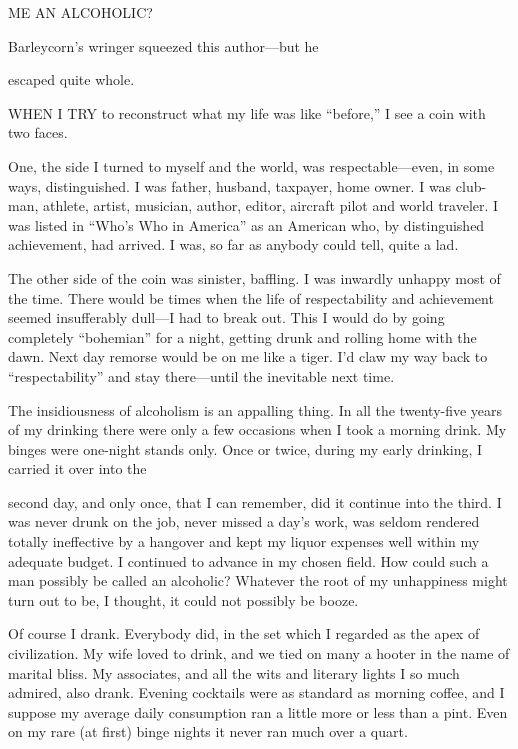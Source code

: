 
ME AN ALCOHOLIC?

Barleycorn’s wringer squeezed this author—but he

escaped quite whole.

       WHEN I TRY to reconstruct what my life was like “before,” I see a coin with two faces.

One, the side I turned to myself and the world, was respectable—even, in some ways, distinguished. I was father, husband, taxpayer, home owner. I was club-man, athlete, artist, musician, author, editor, aircraft pilot and world traveler. I was listed in “Who’s Who in America” as an American who, by distinguished achievement, had arrived. I was, so far as anybody could tell, quite a lad.

The other side of the coin was sinister, baffling. I was inwardly unhappy most of the time. There would be times when the life of respectability and achievement seemed insufferably dull—I had to break out. This I would do by going completely “bohemian” for a night, getting drunk and rolling home with the dawn. Next day remorse would be on me like a tiger. I’d claw my way back to “respectability” and stay there—until the inevitable next time.

The insidiousness of alcoholism is an appalling thing. In all the twenty-five years of my drinking there were only a few occasions when I took a morning drink. My binges were one-night stands only. Once or twice, during my early drinking, I carried it over into the

second day, and only once, that I can remember, did it continue into the third. I was never drunk on the job, never missed a day’s work, was seldom rendered totally ineffective by a hangover and kept my liquor expenses well within my adequate budget. I continued to advance in my chosen field. How could such a man possibly be called an alcoholic? Whatever the root of my unhappiness might turn out to be, I thought, it could not possibly be booze.

Of course I drank. Everybody did, in the set which I regarded as the apex of civilization. My wife loved to drink, and we tied on many a hooter in the name of marital bliss. My associates, and all the wits and literary lights I so much admired, also drank. Evening cocktails were as standard as morning coffee, and I suppose my average daily consumption ran a little more or less than a pint. Even on my rare (at first) binge nights it never ran much over a quart.

